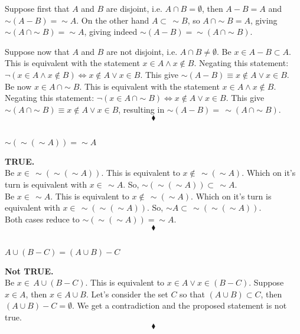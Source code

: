 Suppose first that $A$ and $B$ are disjoint, i.e. $A\cap B =\emptyset$, then $A-B=A$ and $\sim (A-B)=\sim A$. On the other hand $A\subset\, \sim B$, so $A\, \cap \sim B=A$, giving $\sim(A\, \cap \sim B)= \sim A$, giving indeed $\sim(A-B)=\sim(A\, \cap \sim B)$.

Suppose now that $A$ and $B$ are not disjoint, i.e. $A\cap B \ne \emptyset$. Be $x\in A-B\subset A$. This is equivalent with the statement $x\in A \wedge x\not\in B$. Negating this statement: $\lnot(x\in A \wedge x\not\in B)\Leftrightarrow x\not\in A \vee x\in B$. This give $\sim(A-B) \equiv  x\not\in A \vee x\in B$.\\
 Be now $x\in A\, \cap \sim B$. This is equivalent with the statement $x\in A \wedge x\not\in B$. Negating this statement: $\lnot(x\in A\, \cap \sim B)\Leftrightarrow x\not\in A \vee x\in B$. This give $\sim(A\, \cap \sim B )\equiv  x\not\in A \vee x\in B$, resulting in $\sim(A-B)=\, \sim(A\, \cap \sim B)$.  
$$\blacklozenge$$


\subsection{}
\begin{tcolorbox}
$\sim(\sim (\sim A)) =\sim A$
\end{tcolorbox}
\textbf{ TRUE.}\\
Be $x\in \,  \sim(\sim (\sim A))$. This is equivalent to $x\not \in  \, \sim (\sim A)$. Which on it's turn is equivalent with $x \in  \, \sim A$. So, $\sim(\sim (\sim A)) \subset\,\sim A$.\\
Be $x\in \,\sim A$. This is equivalent to $x\not \in \, \sim (\sim A)$. Which on it's turn is equivalent with $x \in  \, \sim(\sim (\sim A))$. So, $\sim A \subset\, \sim(\sim (\sim A))$.\\Both cases reduce to $\sim(\sim (\sim A)) =\sim A$.
$$\blacklozenge$$


\subsection{}
\begin{tcolorbox}
$A\cup(B-C)= (A\cup B)-C$
\end{tcolorbox}
\textbf{Not  TRUE.}\\
Be $x\in \,  A\cup(B-C)$. This is equivalent to $x \in  A \vee x \in (B-C) $. Suppose $x\in A$, then $x\in A\cup B$. Let's consider the  set $C$ so that  $(A\cup B) \subset C$, then $(A\cup B) - C=\emptyset$. We get a contradiction and the proposed statement is not true.
$$\blacklozenge$$

